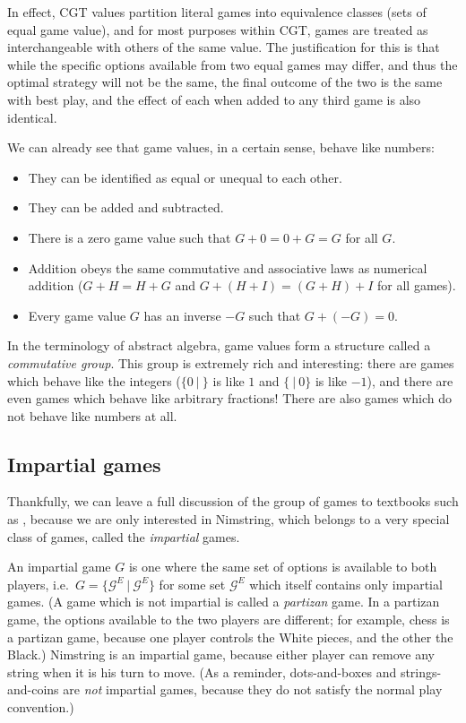 \documentclass[a4paper,twocolumn]{article}
\newcommand{\cgtgame}[2]{\{#1 \:|\: #2\}}
\begin{document}
In effect, CGT values partition literal games into equivalence classes
(sets of equal game value), and for most purposes within CGT, games
are treated as interchangeable with others of the same value. The
justification for this is that while the specific options available
from two equal games may differ, and thus the optimal strategy will
not be the same, the final outcome of the two is the same with best
play, and the effect of each when added to any third game is also
identical.

We can already see that game values, in a certain sense, behave like
numbers:

\begin{itemize}
  \item They can be identified as equal or unequal to each other.
  \item They can be added and subtracted.
  \item There is a zero game value such that $G + 0 = 0 + G = G$ for
    all $G$.
  \item Addition obeys the same commutative and associative laws as
    numerical addition ($G+H = H+G$ and $G+(H+I)=(G+H)+I$ for all
    games).
  \item Every game value $G$ has an inverse $-G$ such that $G + (-G) =
    0$.
\end{itemize}

In the terminology of abstract algebra, game values form a structure
called a \emph{commutative group}. This group is extremely rich and
interesting: there are games which behave like the integers
($\cgtgame{0}{}$ is like $1$ and $\cgtgame{}{0}$ is like $-1$), and
there are even games which behave like arbitrary fractions! There are
also games which do not behave like numbers at all.

\subsection{Impartial games}

Thankfully, we can leave a full discussion of the group of games to
textbooks such as \cite{lip}, because we are only interested in
Nimstring, which belongs to a very special class of games, called the
\emph{impartial} games.

An impartial game $G$ is one where the same set of options is
available to both players, i.e.\ $G =
\cgtgame{\mathcal{G}^E}{\mathcal{G}^E}$ for some set $\mathcal{G}^E$
which itself contains only impartial games. (A game which is not
impartial is called a \emph{partizan} game. In a partizan game, the
options available to the two players are different; for example, chess
is a partizan game, because one player controls the White pieces, and
the other the Black.) Nimstring is an impartial game, because either
player can remove any string when it is his turn to move. (As a
reminder, dots-and-boxes and strings-and-coins are \emph{not}
impartial games, because they do not satisfy the normal play
convention.)
\end{document}

